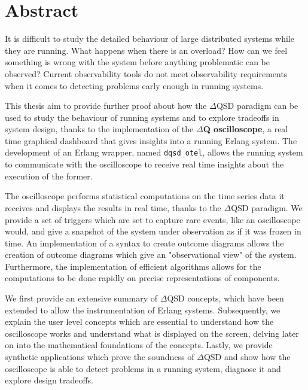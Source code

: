 \chapter*{Abstract}
    It is difficult to study the detailed behaviour of large distributed systems while they are running. What happens when there is an overload? How can we feel something is wrong with the system before anything problematic can be observed? Current observability tools do not meet observability requirements when it comes to detecting problems early enough in running systems. 
    
    This thesis aim to provide further proof about how the $\Delta$QSD paradigm can be used to study the behaviour of running systems and to explore tradeoffs in system design, thanks to the implementation of the \textbf{$\Delta$Q oscilloscope}, a real time graphical dashboard that gives insights into a running Erlang system. The development of an Erlang wrapper, named \texttt{dqsd\_otel}, allows the running system to communicate with the oscilloscope to receive real time insights about the execution of the former.
    
    The oscilloscope performs statistical computations on the time series data it receives and displays the results in real time, thanks to the $\Delta$QSD paradigm. We provide a set of triggers which are set to capture rare events, like an oscilloscope would, and give a snapshot of the system under observation as if it was frozen in time. An implementation of a syntax to create outcome diagrams allows the creation of outcome diagrams which give an "observational view" of the system. Furthermore, the implementation of efficient algorithms allows for the computations to be done rapidly on precise representations of components.

    We first provide an extensive summary of $\Delta$QSD concepts, which have been extended to allow the instrumentation of Erlang systems. Subsequently, we explain the user level concepts which are essential to understand how  the oscilloscope works and understand what is displayed on the screen, delving later on into the mathematical foundations of the concepts. Lastly, we provide synthetic applications which prove the soundness of $\Delta$QSD and show how the oscilloscope is able to detect problems in a running system, diagnose it and explore design tradeoffs.



